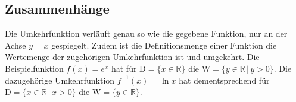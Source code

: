 \documentclass{article}
\begin{document}
\subsection{Zusammenhänge}
\begin{minipage}[t]{\dimexpr\textwidth-5cm}
 \vspace{0pt} 
 Die Umkehrfunktion verläuft genau so wie die gegebene Funktion, nur an der Achse $y=x$ gespiegelt. Zudem ist die Definitionsmenge einer Funktion die Wertemenge der zugehörigen Umkehrfunktion ist und umgekehrt. \newline
 Die Beispielfunktion ${f(x)=e^x}$ hat für ${\mathrm{D}=\{x \in \mathbb{R}\}}$ die ${\mathrm{W}=\{y \in \mathbb{R} \,\vert\, y> 0\}}$. Die dazugehörige Umkehrfunktion ${f^{-1}(x)=\ln{x}}$ hat dementsprechend für ${\mathrm{D}=\{x \in \mathbb{R} \,\vert\, x> 0\}}$ die ${\mathrm{W}=\{y \in \mathbb{R}\}}$.
\end{minipage}
\hfill
\begin{minipage}[t]{5cm}
  \centering
\end{minipage} 
 
\end{document}
